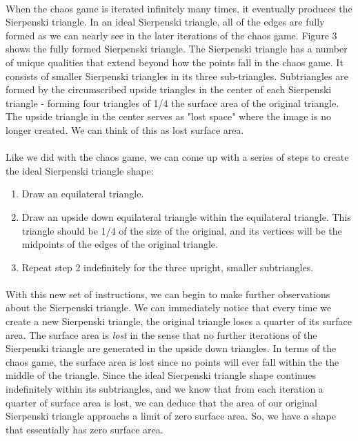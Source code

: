 \documentclass{article}
\begin{document}
\paragraph{}
When the chaos game is iterated infinitely many times, it eventually produces the Sierpenski triangle. In an ideal Sierpenski triangle, all of the edges are fully formed as we can nearly see in the later iterations of the chaos game. Figure 3 shows the fully formed Sierpenski triangle. The Sierpenski triangle has a number of unique qualities that extend beyond how the points fall in the chaos game. It consists of smaller Sierpenski triangles in its three sub-triangles. Subtriangles are formed by the circumscribed upside triangles in the center of each Sierpenski triangle - forming four triangles of 1/4 the surface area of the original triangle. The upside triangle in the center serves as "lost space" where the image is no longer created. We can think of this as lost surface area.
\paragraph{}
Like we did with the chaos game, we can come up with a series of steps to create the ideal Sierpenski triangle shape:
\begin{enumerate}
    \item Draw an equilateral triangle.
    \item Draw an upside down equilateral triangle within the equilateral triangle. This triangle should be 1/4 of the size of the original, and its vertices will be the midpoints of the edges of the original triangle.
    \item Repeat step 2 indefinitely for the three upright, smaller subtriangles.
\end{enumerate}
\paragraph{}
With this new set of instructions, we can begin to make further observations about the Sierpenski triangle. We can immediately notice that every time we create a new Sierpenski triangle, the original triangle loses a quarter of its surface area. The surface area is \textit{lost} in the sense that no further iterations of the Sierpenski triangle are generated in the upside down triangles. In terms of the chaos game, the surface area is lost since no points will ever fall within the the middle of the triangle. Since the ideal Sierpenski triangle shape continues indefinitely within its subtriangles, and we know that from each iteration a quarter of surface area is lost, we can deduce that the area of our original Sierpenski triangle approachs a limit of zero surface area. So, we have a shape that essentially has zero surface area.
\end{document}
